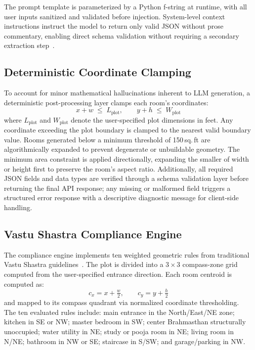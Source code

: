 \documentclass[10pt, twocolumn, letterpaper]{article}
\begin{document}
The prompt template is parameterized by a Python f-string at runtime, with
all user inputs sanitized and validated before injection. System-level context
instructions instruct the model to return only valid JSON without prose
commentary, enabling direct schema validation without requiring a secondary
extraction step~\cite{efficient_guided_gen}.

\subsection{Deterministic Coordinate Clamping}

To account for minor mathematical hallucinations inherent to LLM generation,
a deterministic post-processing layer clamps each room's coordinates:
\begin{equation}
  x + w \;\leq\; L_{\text{plot}}, \qquad y + h \;\leq\; W_{\text{plot}}
\end{equation}
where $L_{\text{plot}}$ and $W_{\text{plot}}$ denote the user-specified plot
dimensions in feet. Any coordinate exceeding the plot boundary is clamped to
the nearest valid boundary value. Rooms generated below a minimum threshold
of 150\,sq.\,ft are algorithmically expanded to prevent degenerate or
unbuildable geometry. The minimum area constraint is applied directionally,
expanding the smaller of width or height first to preserve the room's aspect
ratio. Additionally, all required JSON fields and data types are verified
through a schema validation layer before returning the final API response;
any missing or malformed field triggers a structured error response with
a descriptive diagnostic message for client-side handling.

\subsection{Vastu Shastra Compliance Engine}

The compliance engine implements ten weighted geometric rules from traditional
Vastu Shastra guidelines~\cite{vastu_science}. The plot is divided into a
$3{\times}3$ compass-zone grid computed from the user-specified entrance
direction. Each room centroid is computed as:
\begin{equation}
  c_x = x + \tfrac{w}{2}, \qquad c_y = y + \tfrac{h}{2}
\end{equation}
and mapped to its compass quadrant via normalized coordinate thresholding.
The ten evaluated rules include: main entrance in the North/East/NE zone;
kitchen in SE or NW; master bedroom in SW; center Brahmasthan structurally
unoccupied; water utility in NE; study or pooja room in NE; living room
in N/NE; bathroom in NW or SE; staircase in S/SW; and garage/parking in NW.
\end{document}
